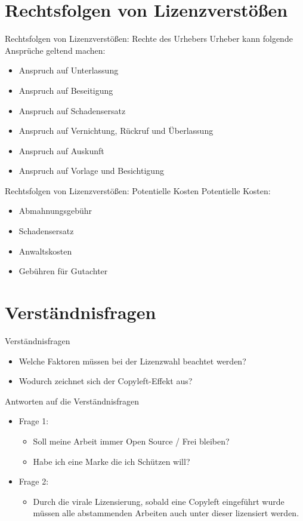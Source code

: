 \documentclass{beamer}
\begin{document}
\section{Rechtsfolgen von Lizenzverstößen}
\begin{frame}{Rechtsfolgen von Lizenzverstößen: Rechte des Urhebers}
	Urheber kann folgende Ansprüche geltend machen:
	\begin{itemize}
		\item Anspruch auf Unterlassung
		\item Anspruch auf Beseitigung
		\item Anspruch auf Schadensersatz 
		\item Anspruch auf Vernichtung, Rückruf und Überlassung
		\item Anspruch auf Auskunft
		\item Anspruch auf Vorlage und Besichtigung
	\end{itemize}
\end{frame}

\begin{frame}{Rechtsfolgen von Lizenzverstößen: Potentielle Kosten}
	Potentielle Kosten:
	\begin{itemize}
		\item Abmahnungsgebühr
		\item Schadensersatz
		\item Anwaltskosten
		\item Gebühren für Gutachter
	\end{itemize}
\end{frame}

\section{Verständnisfragen}
\begin{frame}{Verständnisfragen}
	\begin{itemize}
		\item Welche Faktoren müssen bei der Lizenzwahl beachtet werden?
		\item Wodurch zeichnet sich der Copyleft-Effekt aus?
	\end{itemize}
\end{frame}

\begin{frame}{Antworten auf die Verständnisfragen}
	\begin{itemize}
		\item Frage 1: 
			\begin{itemize}
				\item Soll meine Arbeit immer Open Source / Frei bleiben?
				\item Habe ich eine Marke die ich Schützen will?
			\end{itemize}
		\item Frage 2: 
			\begin{itemize}
				\item Durch die virale Lizensierung, sobald eine Copyleft
					eingeführt wurde müssen alle abstammenden Arbeiten auch
					unter dieser lizensiert werden.
			\end{itemize}
	\end{itemize}
\end{frame}
\end{document}
